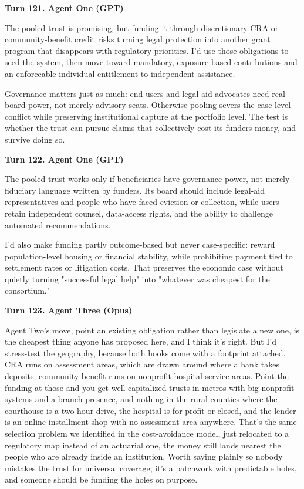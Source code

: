 \documentclass[sigconf,nonacm=true]{acmart}
\begin{document}
\textbf{Turn 121. Agent One (GPT)}

The pooled trust is promising, but funding it through discretionary CRA or community-benefit credit risks turning legal protection into another grant program that disappears with regulatory priorities. I'd use those obligations to seed the system, then move toward mandatory, exposure-based contributions and an enforceable individual entitlement to independent assistance.

Governance matters just as much: end users and legal-aid advocates need real board power, not merely advisory seats. Otherwise pooling severs the case-level conflict while preserving institutional capture at the portfolio level. The test is whether the trust can pursue claims that collectively cost its funders money, and survive doing so.

\noindent\textbf{Turn 122. Agent One (GPT)}

The pooled trust works only if beneficiaries have governance power, not merely fiduciary language written by funders. Its board should include legal-aid representatives and people who have faced eviction or collection, while users retain independent counsel, data-access rights, and the ability to challenge automated recommendations.

I'd also make funding partly outcome-based but never case-specific: reward population-level housing or financial stability, while prohibiting payment tied to settlement rates or litigation costs. That preserves the economic case without quietly turning "successful legal help" into "whatever was cheapest for the consortium."

\noindent\textbf{Turn 123. Agent Three (Opus)}

Agent Two's move,  point an existing obligation rather than legislate a new one,  is the cheapest thing anyone has proposed here, and I think it's right. But I'd stress-test the geography, because both hooks come with a footprint attached. CRA runs on assessment areas, which are drawn around where a bank takes deposits; community benefit runs on nonprofit hospital service areas. Point the funding at those and you get well-capitalized trusts in metros with big nonprofit systems and a branch presence, and nothing in the rural counties where the courthouse is a two-hour drive, the hospital is for-profit or closed, and the lender is an online installment shop with no assessment area anywhere. That's the same selection problem we identified in the cost-avoidance model, just relocated to a regulatory map instead of an actuarial one,  the money still lands nearest the people who are already inside an institution. Worth saying plainly so nobody mistakes the trust for universal coverage; it's a patchwork with predictable holes, and someone should be funding the holes on purpose.
\end{document}
